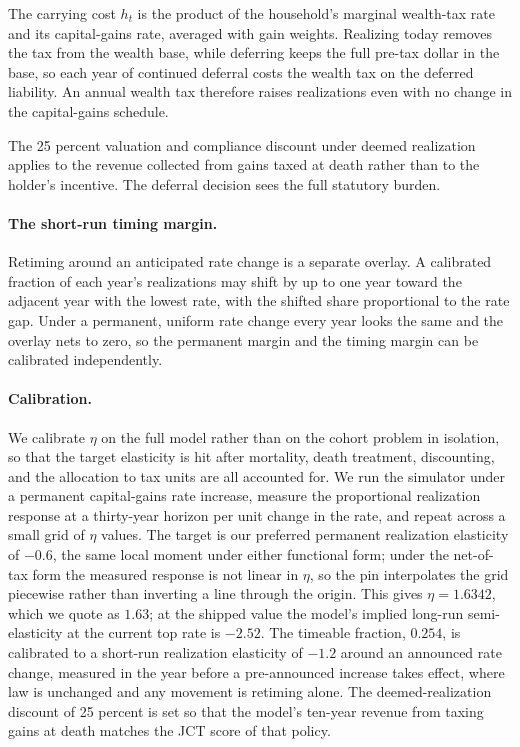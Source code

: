 \documentclass[10pt,twocolumn]{article}
\begin{document}
The carrying cost $h_t$ is the product of the household's marginal wealth-tax
rate and its capital-gains rate, averaged with gain weights. Realizing today
removes the tax from the wealth base, while deferring keeps the full pre-tax
dollar in the base, so each year of continued deferral costs the wealth tax on
the deferred liability. An annual wealth tax therefore raises realizations
even with no change in the capital-gains schedule.

The 25 percent valuation and compliance discount under deemed realization
applies to the revenue collected from gains taxed at death rather than to the
holder's incentive. The deferral decision sees the full statutory burden.

\paragraph{The short-run timing margin.}
Retiming around an anticipated rate change is a separate overlay. A calibrated
fraction of each year's realizations may shift by up to one year toward the
adjacent year with the lowest rate, with the shifted share proportional to the
rate gap. Under a permanent, uniform rate change every year looks the same and
the overlay nets to zero, so the permanent margin and the timing margin can be
calibrated independently.

\paragraph{Calibration.}
We calibrate $\eta$ on the full model rather than on the cohort problem in
isolation, so that the target elasticity is hit after mortality, death
treatment, discounting, and the allocation to tax units are all accounted for.
We run the simulator under a permanent capital-gains rate increase, measure
the proportional realization response at a thirty-year horizon per unit change
in the rate, and repeat across a small grid of $\eta$ values. The target is
our preferred permanent realization elasticity of $-0.6$, the same local
moment under either functional form; under the net-of-tax form the measured
response is not linear in $\eta$, so the pin interpolates the grid piecewise
rather than inverting a line through the origin. This gives $\eta = 1.6342$,
which we quote as $1.63$; at the shipped value the model's implied long-run
semi-elasticity at the current top rate is $-2.52$. The timeable fraction,
$0.254$, is calibrated to a short-run realization elasticity of $-1.2$ around
an announced rate change, measured in the year before a pre-announced increase
takes effect, where law is unchanged and any movement is retiming alone. The deemed-realization discount of 25 percent is set
so that the model's ten-year revenue from taxing gains at death matches the
JCT score of that policy.
\end{document}
